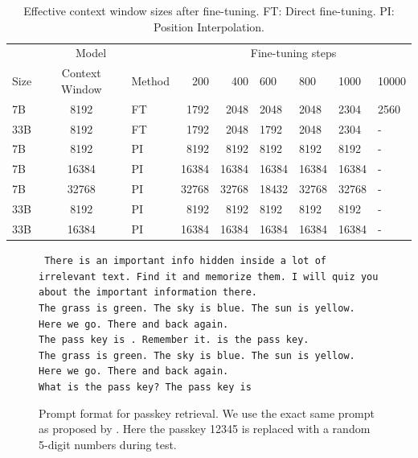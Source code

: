 \documentclass{article} %
\theoremstyle{definition}
\newcommand{\ignore}[1]{}
\begin{document}
\ignore{
This result highlights the effectiveness of our methods: Position Interpolation 

This also suggested the inefficiency of direct fine-tuning for extending LLaMA models to 
much longer context windows.
}

\begin{table}[th]
    \centering
\begin{tabular}{lclrrllll}
\toprule
    \multicolumn{3}{c}{Model} & \multicolumn{6}{c}{Fine-tuning steps}\\
  Size &  Context Window & Method &    200 &   400 &    600 &    800 &    1000 &   10000 \\
\midrule
 7B &  8192 &   FT &  1792 &    2048 &   2048 &  2048  & 2304 & 2560 \\
 33B &  8192 &   FT &  1792 &    2048 &   1792 &  2048  & 2304 & - \\
\midrule
 7B &  8192 &   PI &  8192 &  8192 &8192 &        8192 &       8192 &       - \\
 7B & 16384 &   PI  & 16384 & 16384 &  16384 &    16384 &       16384 &       - \\
 7B & 32768 &   PI & 32768 & 32768 &  18432 &  32768 &       32768 &       - \\
33B &  8192 &   PI &  8192 &  8192 &   8192 &   8192 &       8192 &       - \\
33B &  16384 &   PI&  16384 &  16384 &   16384 &   16384 &       16384 &       - \\
\bottomrule
\end{tabular}
    \caption{\small Effective context window sizes after fine-tuning. FT: Direct fine-tuning. PI: Position Interpolation.}
    \label{fig:passcode}
\end{table}

\begin{figure}[th]
    \small
	\texttt{\noindent
		There is an important info hidden inside a lot of irrelevant text. Find it and memorize them. I will quiz you about the important information there.\\
		The grass is green. The sky is blue. The sun is yellow. Here we go. There and back again. {\color{blue}{(repeat X times)}} \\
		The pass key is {\color{red}{12345}}. Remember it. {\color{red}{12345}} is the pass key.\\
		The grass is green. The sky is blue. The sun is yellow. Here we go. There and back again. {\color{blue}{(repeat Y times)}} \\
		What is the pass key? The pass key is\\
	}
	\caption{\small Prompt format for passkey retrieval. We use the exact same prompt as proposed by \citet{mohtashami2023landmark}. Here the passkey 12345 is replaced with a random 5-digit numbers during test.}
	\label{fig:passcode-prompt}
\end{figure}
\end{document}
